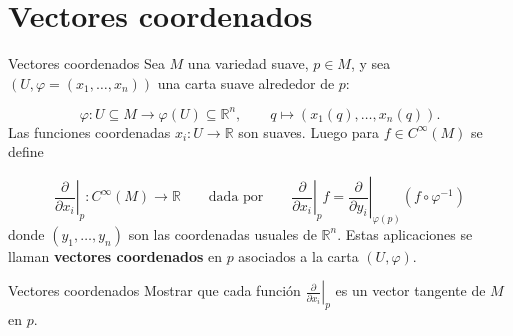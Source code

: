 \section{Vectores coordenados}
\begin{bookdefinition}{Vectores coordenados}
Sea $M$ una variedad suave, $p\in M$, y sea $(U,\varphi=(x_1,\dots,x_n))$ una carta suave alrededor de $p$:

\[
\varphi:U\subseteq M\to \varphi(U)\subseteq\mathbb{R}^n,\qquad q\mapsto (x_1(q),\dots,x_n(q)).
\]
Las funciones coordenadas $x_i:U\to\mathbb{R}$ son suaves. Luego para $f\in C^\infty(M)$ se define

\[
\left.\frac{\partial}{\partial x_i}\right|_p:C^{\infty}(M)\rightarrow \mathbb{R}\qquad\text{dada por}\qquad\left.\frac{\partial}{\partial x_i}\right|_p f=\left.\frac{\partial}{\partial y_i}\right|_{\varphi(p)}(f\circ\varphi^{-1})
\]
donde $(y_1,\dots,y_n)$ son las coordenadas usuales de $\mathbb{R}^n$. Estas aplicaciones se llaman \textbf{vectores coordenados} en $p$ asociados a la carta $(U,\varphi)$.

\end{bookdefinition}
\begin{bookexercise}{Vectores coordenados}
Mostrar que cada función $\left.\frac{\partial}{\partial x_i}\right|_p$ es un vector tangente de $M$ en $p$.

\end{bookexercise}
